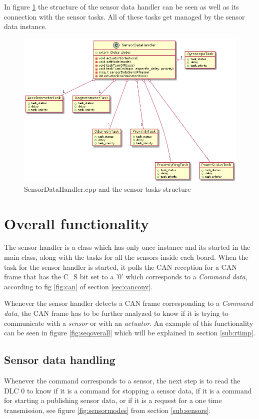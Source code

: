 \documentclass[12pt]{report}%
\begin{document}
In figure \ref{fig:sensorclass} the structure of the sensor data handler can be seen as well as its connection with the sensor tasks. All of these tasks get managed by the sensor data instance.

\begin{figure}[ht]
	\includegraphics[width=15cm]{sensorclass}%
  	\caption{SensorDataHandler.cpp and the sensor tasks structure}
  	\label{fig:sensorclass}
\end{figure}

\section{Overall functionality}
The sensor handler is a class which has only once instance and its started in the main class, along with the tasks for all the sensors inside each board. When the task for the sensor handler is started, it polls the CAN reception for a CAN frame that has the C\_S bit set to a '0' which corresponds to a \textit{Command data}, according to fig \ref{fig:can} of section \ref{sec:canconv}.

Whenever the sensor handler detects a CAN frame corresponding to a \textit{Command data}, the CAN frame has to be further analyzed to know if it is trying to communicate with a \textit{sensor} or with an \textit{actuator}. An example of this functionality can be seen in figure \ref{fig:seqoverall} which will be explained in section \ref{sub:rtimp}.

\subsection{Sensor data handling}
Whenever the command corresponds to a sensor, the next step is to read the DLC 0 to know if it is a command for stopping a sensor data, if it is a command for starting a publishing sensor data, or if it is a request for a one time transmission, see figure \ref{fig:sensormodes} from section \ref{sub:sensors}.
\end{document}
